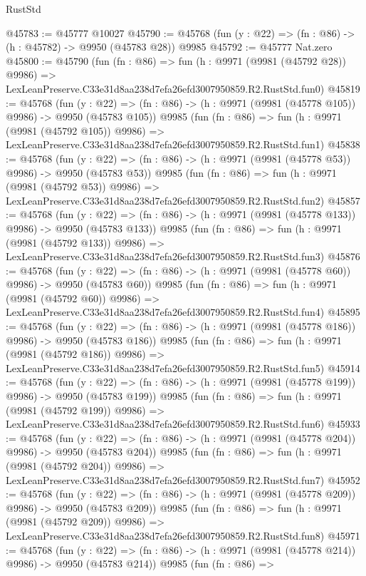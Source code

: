 \begin{lexlean}{RustStd}
\begin{coremodule}
@45783 := @45777 @10027
@45790 := @45768 (fun (y : @22) => (fn : @86) -> (h : @45782) -> @9950 (@45783 @28)) @9985
@45792 := @45777 Nat.zero
@45800 := @45790
    (fun (fn : @86) =>
    fun (h : @9971 (@9981 (@45792 @28)) @9986) =>
    LexLeanPreserve.C33e31d8aa238d7efa26efd3007950859.R2.RustStd.fun0)
@45819 := @45768
    (fun (y : @22) => (fn : @86) -> (h : @9971 (@9981 (@45778 @105)) @9986) -> @9950 (@45783 @105))
    @9985
    (fun (fn : @86) =>
    fun (h : @9971 (@9981 (@45792 @105)) @9986) =>
    LexLeanPreserve.C33e31d8aa238d7efa26efd3007950859.R2.RustStd.fun1)
@45838 := @45768
    (fun (y : @22) => (fn : @86) -> (h : @9971 (@9981 (@45778 @53)) @9986) -> @9950 (@45783 @53))
    @9985
    (fun (fn : @86) =>
    fun (h : @9971 (@9981 (@45792 @53)) @9986) =>
    LexLeanPreserve.C33e31d8aa238d7efa26efd3007950859.R2.RustStd.fun2)
@45857 := @45768
    (fun (y : @22) => (fn : @86) -> (h : @9971 (@9981 (@45778 @133)) @9986) -> @9950 (@45783 @133))
    @9985
    (fun (fn : @86) =>
    fun (h : @9971 (@9981 (@45792 @133)) @9986) =>
    LexLeanPreserve.C33e31d8aa238d7efa26efd3007950859.R2.RustStd.fun3)
@45876 := @45768
    (fun (y : @22) => (fn : @86) -> (h : @9971 (@9981 (@45778 @60)) @9986) -> @9950 (@45783 @60))
    @9985
    (fun (fn : @86) =>
    fun (h : @9971 (@9981 (@45792 @60)) @9986) =>
    LexLeanPreserve.C33e31d8aa238d7efa26efd3007950859.R2.RustStd.fun4)
@45895 := @45768
    (fun (y : @22) => (fn : @86) -> (h : @9971 (@9981 (@45778 @186)) @9986) -> @9950 (@45783 @186))
    @9985
    (fun (fn : @86) =>
    fun (h : @9971 (@9981 (@45792 @186)) @9986) =>
    LexLeanPreserve.C33e31d8aa238d7efa26efd3007950859.R2.RustStd.fun5)
@45914 := @45768
    (fun (y : @22) => (fn : @86) -> (h : @9971 (@9981 (@45778 @199)) @9986) -> @9950 (@45783 @199))
    @9985
    (fun (fn : @86) =>
    fun (h : @9971 (@9981 (@45792 @199)) @9986) =>
    LexLeanPreserve.C33e31d8aa238d7efa26efd3007950859.R2.RustStd.fun6)
@45933 := @45768
    (fun (y : @22) => (fn : @86) -> (h : @9971 (@9981 (@45778 @204)) @9986) -> @9950 (@45783 @204))
    @9985
    (fun (fn : @86) =>
    fun (h : @9971 (@9981 (@45792 @204)) @9986) =>
    LexLeanPreserve.C33e31d8aa238d7efa26efd3007950859.R2.RustStd.fun7)
@45952 := @45768
    (fun (y : @22) => (fn : @86) -> (h : @9971 (@9981 (@45778 @209)) @9986) -> @9950 (@45783 @209))
    @9985
    (fun (fn : @86) =>
    fun (h : @9971 (@9981 (@45792 @209)) @9986) =>
    LexLeanPreserve.C33e31d8aa238d7efa26efd3007950859.R2.RustStd.fun8)
@45971 := @45768
    (fun (y : @22) => (fn : @86) -> (h : @9971 (@9981 (@45778 @214)) @9986) -> @9950 (@45783 @214))
    @9985
    (fun (fn : @86) =>

\end{coremodule}
\end{lexlean}
